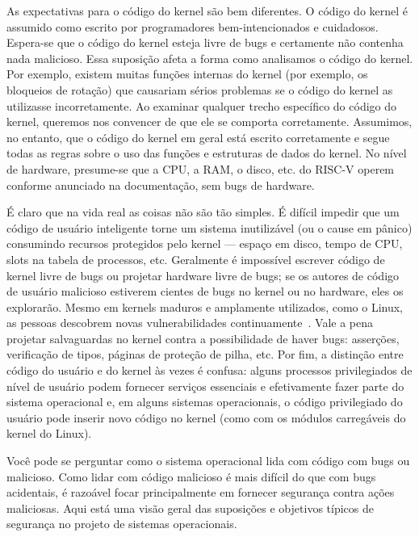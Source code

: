 As expectativas para o código do kernel são bem diferentes. O código do kernel
é assumido como escrito por programadores bem-intencionados e cuidadosos.
Espera-se que o código do kernel esteja livre de bugs e certamente não contenha
nada malicioso. Essa suposição afeta a forma como analisamos o código do kernel.
Por exemplo, existem muitas funções internas do kernel (por exemplo, os bloqueios de rotação)
que causariam sérios problemas se o código do kernel as utilizasse
incorretamente. Ao examinar qualquer trecho específico do código do kernel,
queremos nos convencer de que ele se comporta corretamente. Assumimos,
no entanto, que o código do kernel em geral está escrito corretamente e segue
todas as regras sobre o uso das funções e estruturas de dados do kernel.
No nível de hardware, presume-se que a CPU, a RAM, o disco, etc. do RISC-V operem conforme anunciado na documentação, sem bugs de hardware.

É claro que na vida real as coisas não são tão simples. É
difícil impedir que um código de usuário inteligente torne um sistema inutilizável
(ou o cause em pânico) consumindo recursos protegidos pelo kernel —
espaço em disco, tempo de CPU, slots na tabela de processos, etc. Geralmente é
impossível escrever código de kernel livre de bugs ou projetar hardware livre de bugs; se os
autores de código de usuário malicioso estiverem cientes de bugs no kernel ou no hardware,
eles os explorarão. Mesmo em kernels maduros e amplamente utilizados, como
o Linux, as pessoas descobrem novas vulnerabilidades
continuamente~\cite{mitre:cves}. Vale a pena projetar salvaguardas no
kernel contra a possibilidade de haver bugs: asserções, verificação de
tipos, páginas de proteção de pilha, etc. Por fim, a distinção entre
código do usuário e do kernel às vezes é confusa: alguns processos privilegiados de nível de usuário
podem fornecer serviços essenciais e efetivamente fazer parte
do sistema operacional e, em alguns sistemas operacionais, o código privilegiado do usuário
pode inserir novo código no kernel (como com os módulos carregáveis
do kernel do Linux).

Você pode se perguntar como o sistema operacional lida com código com bugs ou malicioso. Como lidar com código malicioso é mais difícil do que com bugs acidentais, é razoável focar principalmente em fornecer segurança contra ações maliciosas. Aqui está uma visão geral das suposições e objetivos típicos de segurança no projeto de sistemas operacionais.

